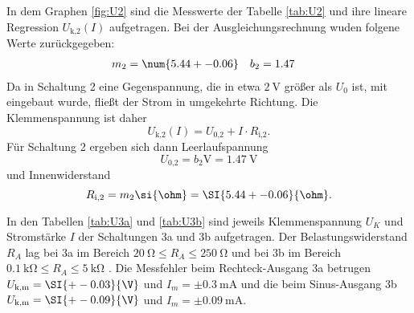   In dem Graphen \ref{fig:U2} sind die Messwerte der Tabelle
  \ref{tab:U2} und ihre lineare Regression
  $U_\text{k,2}(I)$ aufgetragen.
  Bei der Ausgleichungsrechnung wuden folgene Werte zurückgegeben:
  \begin{align}
    m_2 & = \num{5.44 +- 0.06} & b_2 & = 1.47
  \end{align}
  Da in Schaltung 2 eine Gegenspannung, die in etwa $\SI{2}{\V}$ größer als
  $U_0$ ist, mit eingebaut wurde, fließt der Strom in umgekehrte Richtung.
  Die Klemmenspannung ist daher
  \begin{equation}
    U_\text{k,2}(I) = U_\text{0,2} + I \cdot R_\text{i,2}.
  \end{equation}
  Für Schaltung 2 ergeben sich dann Leerlaufspannung
  \begin{equation}
    U_\text{0,2} = b_2 \si{\V} = \SI{1.47}{\V}
  \end{equation}
  und Innenwiderstand
  \begin{equation}
    R_\text{i,2} = m_2 \si{\ohm} = \SI{5.44 +- 0.06}{\ohm}.
  \end{equation}

  \newpage

  In den Tabellen \ref{tab:U3a} und \ref{tab:U3b} sind jeweils
  Klemmenspannung $U_K$ und Stromstärke $I$
  der Schaltungen 3a und 3b aufgetragen. Der Belastungswiderstand $R_A$
  lag bei 3a im Bereich $ \SI{20}{\ohm} \leq R_A \leq \SI{250}{\ohm} $ und bei
  3b im Bereich $ \SI{0.1}{\kilo\ohm} \leq R_A \leq \SI{5}{\kilo\ohm} $ .
  Die Messfehler beim Rechteck-Ausgang 3a betrugen
  $U_\text{k,m} = \SI{+-0.03}{\V}$ und $I_m = \pm \SI{0.3}{\milli\A}$ und die
  beim Sinus-Ausgang 3b $U_\text{k,m} = \SI{+-0.09}{\V}$ und
  $I_m = \pm \SI{0.09}{\milli\A}$.

